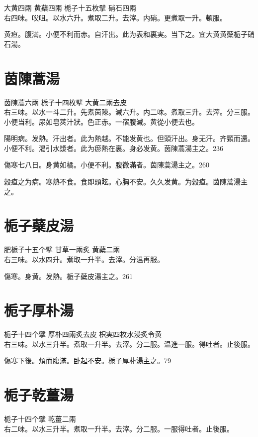 大黄{\scriptsize 四兩} 黄蘗{\scriptsize 四兩} 栀子{\scriptsize 十五枚擘} 硝石{\scriptsize 四兩}\\
右四味。㕮咀。以水六升。煮取二升。去滓。内硝。更煮取一升。頓服。

黄疸。腹滿。小便不利而赤。自汗出。此为表和裏実。当下之。宜大黄{\khaai 黄蘗栀子}硝石湯。

\section{茵陳蒿湯}

茵陳蒿{\scriptsize 六兩} 栀子{\scriptsize 十四枚擘} 大黄{\scriptsize 二兩去皮}\\
右三味。以水一斗二升。先煮茵陳。減六升。内二味。煮取三升。去滓。分三服。小便当利。尿如皂莢汁狀。色正赤。一宿腹減。黄從小便去也。

陽明病。发熱。汗出者。此为熱越。不能发黄也。但頭汗出。身无汗。齐頸而還。小便不利。渴引水漿者。此为瘀熱在裏。身必发黄。茵陳{\khaai 蒿}湯主之。236

傷寒七八日。身黄如橘。小便不利。腹微滿者。茵陳{\khaai 蒿}湯主之。260

穀疸之为病。寒熱不食。食即頭眩。心胸不安。久久发黄。为穀疸。茵陳蒿湯主之。

\section{栀子蘗皮湯}

肥栀子{\scriptsize 十五个擘} 甘草{\scriptsize 一兩炙} 黄蘗{\scriptsize 二兩}\\
右三味。以水四升。煮取一升半。去滓。分温再服。

傷寒。身黄。发熱。栀子蘗皮湯主之。261

\section{栀子厚朴湯}

栀子{\scriptsize 十四个擘} 厚朴{\scriptsize 四兩炙去皮} 枳実{\scriptsize 四枚水浸炙令黄}\\
右三味。以水三升半。煮取一升半。去滓。分二服。温進一服。得吐者。止後服。

傷寒下後。煩而腹滿。卧起不安。栀子厚朴湯主之。79

\section{栀子乾薑湯}

栀子{\scriptsize 十四个擘} 乾薑{\scriptsize 二兩}\\
右二味。以水三升半。煮取一升半。去滓。分二服。一服得吐者。止後服。


